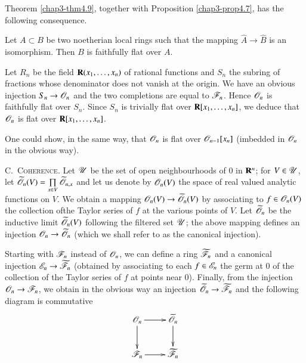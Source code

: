 Theorem \ref{chap3-thm4.9}, together with Proposition \ref{chap3-prop4.7}, has the following consequence.

\begin{proposition}\label{chap3-prop4.10}
Let $A\subset B$ be two noetherian local rings such that the mapping $\widehat{A}\to \widehat{B}$ is an isomorphism. Then $B$ is faithfully flat over $A$.
\end{proposition}

\begin{example}\label{chap3-exam4.11}
Let $R_{n}$ be the field $\mathbf{R}(x_{1},\ldots,x_{n})$ of rational functions and $S_{n}$ the subring of fractions whose denominator does not vanish at the origin. We have an obvious injection $S_{n}\to \mathscr{O}_{n}$ and the two completions are equal to $\mathscr{F}_{n}$. Hence $\mathscr{O}_{n}$ is faithfully flat over $S_{n}$. Since $S_{n}$ is trivially flat over $\mathbf{R}[x_{1},\ldots,x_{n}]$, we deduce that $\mathscr{O}_{n}$ is flat over $\mathbf{R}[x_{1},\ldots,x_{n}]$.
\end{example}

One could show, in the same way, that $\mathscr{O}_{n}$ is flat over $\mathscr{O}_{n-1}[x_{n}]$ (imbedded in $\mathscr{O}_{n}$ in the obvious way).

C.~\textsc{Coherence.} Let $\mathscr{U}$ be the set of open neighbourhoods of $0$ in $\mathbf{R}^{n}$; for $V\in \mathscr{U}$, let $\widetilde{\mathscr{O}}_{n}(V)=\prod\limits_{x\in V}\widetilde{\mathscr{O}}_{n,x}$ and let us denote by $\mathscr{O}_{n}(V)$ the space of real valued analytic functions on $V$. We obtain a mapping $\mathscr{O}_{n}(V)\to \widetilde{\mathscr{O}}_{n}(V)$ by associating to $f\in \mathscr{O}_{n}(V)$ the collection of\pageoriginale the Taylor series of $f$ at the various points of $V$. Let $\widetilde{\mathscr{O}}_{n}$ be the inductive limit $\widetilde{\mathscr{O}}_{n}(V)$ following the filtered set $\mathscr{U}$; the above mapping defines an injection $\mathscr{O}_{n}\to \widetilde{\mathscr{O}}_{n}$ (which we shall refer to as the canonical injection).

Starting with $\mathscr{F}_{n}$ instead of $\mathscr{O}_{n}$, we can define a ring $\widetilde{\mathscr{F}}_{n}$ and a canonical injection $\mathscr{E}_{n}\to \widetilde{\mathscr{F}}_{n}$ (obtained by associating to each $f\in \mathscr{E}_{n}$ the germ at $0$ of the collection of the Taylor series of $f$ at points near $0$). Finally, from the injection $\mathscr{O}_{n}\to \mathscr{F}_{n}$, we obtain in the obvious way an injection $\widetilde{\mathscr{O}}_{n}\to \widetilde{\mathscr{F}}_{n}$ and the following diagram is commutative
\[
\xymatrix{
\scrO_{n}\ar[d]\ar[r] & \widetilde{\scrO}_{n}\ar[d]\\
\scrF_{n}\ar[r] & \widetilde{\scrF}_{n}
}
\]

